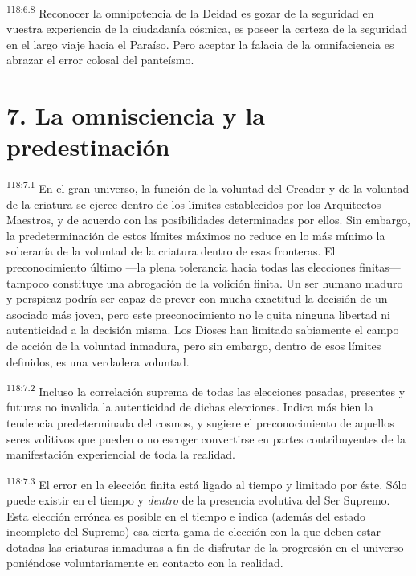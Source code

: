 \par
\textsuperscript{118:6.8} Reconocer la omnipotencia de la Deidad es gozar de la seguridad en vuestra experiencia de la ciudadanía cósmica, es poseer la certeza de la seguridad en el largo viaje hacia el Paraíso. Pero aceptar la falacia de la omnifaciencia es abrazar el error colosal del panteísmo.

\section*{7. La omnisciencia y la predestinación}
\par
\textsuperscript{118:7.1} En el gran universo, la función de la voluntad del Creador y de la voluntad de la criatura se ejerce dentro de los límites establecidos por los Arquitectos Maestros, y de acuerdo con las posibilidades determinadas por ellos. Sin embargo, la predeterminación de estos límites máximos no reduce en lo más mínimo la soberanía de la voluntad de la criatura dentro de esas fronteras. El preconocimiento último ---la plena tolerancia hacia todas las elecciones finitas--- tampoco constituye una abrogación de la volición finita. Un ser humano maduro y perspicaz podría ser capaz de prever con mucha exactitud la decisión de un asociado más joven, pero este preconocimiento no le quita ninguna libertad ni autenticidad a la decisión misma. Los Dioses han limitado sabiamente el campo de acción de la voluntad inmadura, pero sin embargo, dentro de esos límites definidos, es una verdadera voluntad.

\par
\textsuperscript{118:7.2} Incluso la correlación suprema de todas las elecciones pasadas, presentes y futuras no invalida la autenticidad de dichas elecciones. Indica más bien la tendencia predeterminada del cosmos, y sugiere el preconocimiento de aquellos seres volitivos que pueden o no escoger convertirse en partes contribuyentes de la manifestación experiencial de toda la realidad.

\par
\textsuperscript{118:7.3} El error en la elección finita está ligado al tiempo y limitado por éste. Sólo puede existir en el tiempo y \textit{dentro} de la presencia evolutiva del Ser Supremo. Esta elección errónea es posible en el tiempo e indica (además del estado incompleto del Supremo) esa cierta gama de elección con la que deben estar dotadas las criaturas inmaduras a fin de disfrutar de la progresión en el universo poniéndose voluntariamente en contacto con la realidad.

